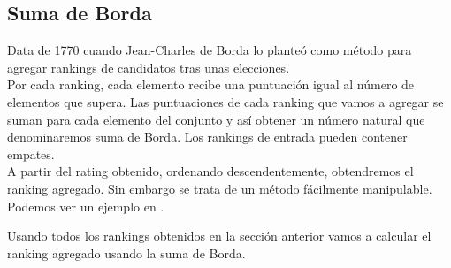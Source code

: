 \subsection{Suma de Borda}
Data de 1770 cuando Jean-Charles de Borda lo planteó como método para agregar rankings de candidatos tras unas elecciones.\\

Por cada ranking, cada elemento recibe una puntuación igual al número de elementos que supera. Las puntuaciones de cada ranking que vamos a agregar se suman para cada elemento del conjunto y así obtener un número natural que denominaremos suma de Borda. Los rankings de entrada pueden contener empates.\\

A partir del rating obtenido, ordenando descendentemente, obtendremos el ranking agregado. Sin embargo se trata de un método fácilmente manipulable. Podemos ver un ejemplo en \cite[pág 854]{refborda}.

\newpage

\begin{ejem} Usando todos los rankings obtenidos en la sección anterior vamos a calcular el ranking agregado usando la suma de Borda.
\end{ejem}

